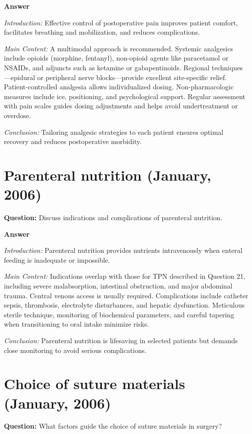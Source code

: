 \documentclass{article}
\begin{document}
\textbf{Answer}

\emph{Introduction:} Effective control of postoperative pain improves patient comfort, facilitates breathing and mobilization, and reduces complications.

\emph{Main Content:} A multimodal approach is recommended. Systemic analgesics include opioids (morphine, fentanyl), non-opioid agents like paracetamol or NSAIDs, and adjuncts such as ketamine or gabapentinoids. Regional techniques—epidural or peripheral nerve blocks—provide excellent site-specific relief. Patient-controlled analgesia allows individualized dosing. Non-pharmacologic measures include ice, positioning, and psychological support. Regular assessment with pain scales guides dosing adjustments and helps avoid undertreatment or overdose.

\emph{Conclusion:} Tailoring analgesic strategies to each patient ensures optimal recovery and reduces postoperative morbidity.


\section{Parenteral nutrition (January, 2006)}


\textbf{Question:} Discuss indications and complications of parenteral nutrition.

\textbf{Answer}

\emph{Introduction:} Parenteral nutrition provides nutrients intravenously when enteral feeding is inadequate or impossible.

\emph{Main Content:} Indications overlap with those for TPN described in Question 21, including severe malabsorption, intestinal obstruction, and major abdominal trauma. Central venous access is usually required. Complications include catheter sepsis, thrombosis, electrolyte disturbances, and hepatic dysfunction. Meticulous sterile technique, monitoring of biochemical parameters, and careful tapering when transitioning to oral intake minimize risks.

\emph{Conclusion:} Parenteral nutrition is lifesaving in selected patients but demands close monitoring to avoid serious complications.


\section{Choice of suture materials (January, 2006)}


\textbf{Question:} What factors guide the choice of suture materials in surgery?
\end{document}
